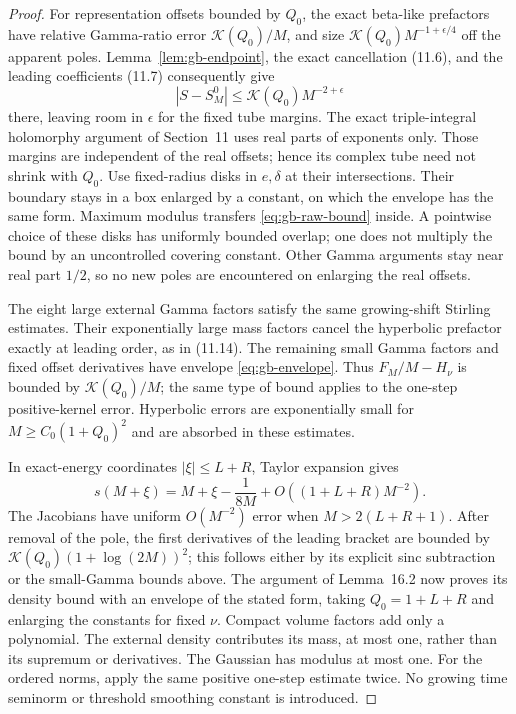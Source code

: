 \begin{proof}
For representation offsets bounded by $Q_0$, the exact beta-like
prefactors have relative Gamma-ratio error
$\mathcal K(Q_0)/M$, and size
$\mathcal K(Q_0)M^{-1+\epsilon/4}$ off the apparent poles.
Lemma~\ref{lem:gb-endpoint}, the exact cancellation (11.6), and the
leading coefficients (11.7) consequently give
\begin{equation}
 |S-S_M^0|\le\mathcal K(Q_0)M^{-2+\epsilon}
 \label{eq:gb-raw-bound}
\end{equation}
there, leaving room in $\epsilon$ for the fixed tube margins.
The exact triple-integral holomorphy argument of Section~11 uses
real parts of exponents only. Those margins are independent of the
real offsets; hence its complex tube need not shrink with $Q_0$.
Use fixed-radius disks in $e,\delta$ at their intersections. Their
boundary stays in a box enlarged by a constant, on which the envelope
has the same form. Maximum modulus transfers \eqref{eq:gb-raw-bound}
inside. A pointwise choice of these disks has uniformly bounded overlap;
one does not multiply the bound by an uncontrolled covering constant.
Other Gamma arguments stay near real part $1/2$, so no new poles are
encountered on enlarging the real offsets.

The eight large external Gamma factors satisfy the same growing-shift
Stirling estimates. Their exponentially large mass factors cancel
the hyperbolic prefactor exactly at leading order, as in (11.14).
The remaining small Gamma factors and fixed offset derivatives have
envelope \eqref{eq:gb-envelope}. Thus $F_M/M-H_\nu$ is bounded by
$\mathcal K(Q_0)/M$; the same type of bound applies to the one-step
positive-kernel error. Hyperbolic errors are exponentially small for
$M\ge C_0(1+Q_0)^2$ and are absorbed in these estimates.

In exact-energy coordinates $|\xi|\le L+R$, Taylor expansion gives
\[
 s(M+\xi)=M+\xi-\frac1{8M}
                   +O((1+L+R)M^{-2}).
\]
The Jacobians have uniform $O(M^{-2})$ error when $M>2(L+R+1)$.
After removal of the pole, the first derivatives of the leading bracket
are bounded by $\mathcal K(Q_0)(1+\log(2M))^2$; this follows either
by its explicit sinc subtraction or the small-Gamma bounds above.
The argument of Lemma~16.2 now proves its density bound with an
envelope of the stated form, taking $Q_0=1+L+R$ and enlarging the
constants for fixed $\nu$. Compact volume factors add only a polynomial.
The external density contributes its mass, at most one, rather than
its supremum or derivatives. The Gaussian has modulus at most one.
For the ordered norms, apply the same positive one-step estimate twice.
No growing time seminorm or threshold smoothing constant is introduced.
\end{proof}

